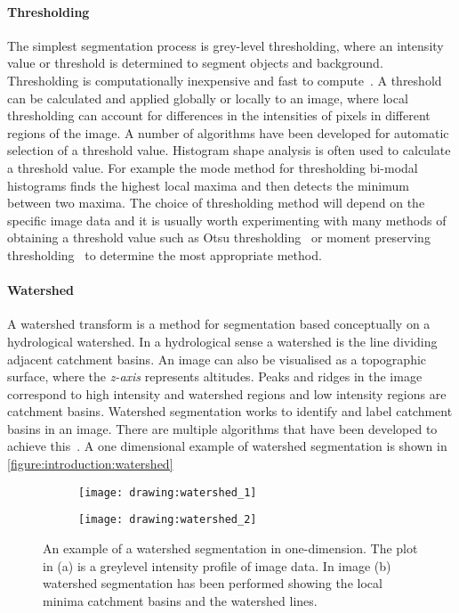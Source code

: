 \paragraph{Thresholding} The simplest segmentation process is grey-level thresholding, where an intensity value or threshold is determined to segment objects and background. Thresholding is computationally inexpensive and fast to compute~\cite{Sonka2007}. A threshold can be calculated and applied globally or locally to an image, where local thresholding can account for differences in the intensities of pixels in different regions of the image. A number of algorithms have been developed for automatic selection of a threshold value. Histogram shape analysis is often used to calculate a threshold value. For example the mode method for thresholding bi-modal histograms finds the highest local maxima and then detects the minimum between two maxima. The choice of thresholding method will depend on the specific image data and it is usually worth experimenting with many methods of obtaining a threshold value such as Otsu thresholding~\cite{Otsu1979,Kittler1986} or moment preserving thresholding~\cite{Tsai1985} to determine the most appropriate method.

\paragraph{Watershed} A watershed transform is a method for segmentation based conceptually on a hydrological watershed. In a hydrological sense a watershed is the line dividing adjacent catchment basins. An image can also be visualised as a topographic surface, where the \emph{z-axis} represents altitudes. Peaks and ridges in the image correspond to high intensity and watershed regions and low intensity regions are catchment basins. Watershed segmentation works to identify and label catchment basins in an image. There are multiple algorithms that have been developed to achieve this~\cite{Roerdink2000}. A one dimensional example of watershed segmentation is shown in \autoref{figure:introduction:watershed}

\begin{figure}[htbp!]\centering
	\begin{subfigure}[b]{0.48\linewidth}
		\centering
		\texttt{[image: drawing:watershed\_1]}
		\caption{}
		\label{figure:introduction:watershed_1}
	\end{subfigure}
	\begin{subfigure}[b]{0.48\linewidth}
		\centering
		\texttt{[image: drawing:watershed\_2]}
		\caption{}
		\label{figure:introduction:watershed_2}
	\end{subfigure}
\caption[Watershed transform 1D]{An example of a watershed segmentation in one-dimension. The plot in (a) is a greylevel intensity profile of image data. In image (b) watershed segmentation has been performed showing the local minima catchment basins and the watershed lines.}
\label{figure:introduction:watershed}
\end{figure}

